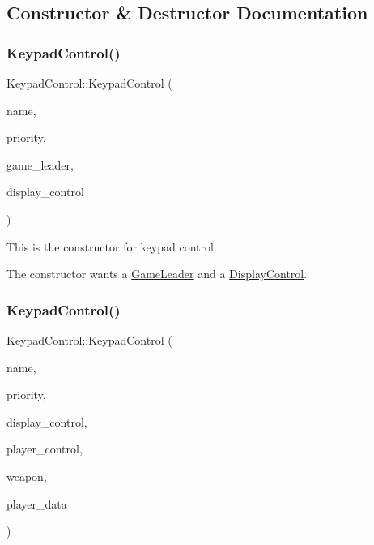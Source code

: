 \subsection{Constructor \& Destructor Documentation}
\mbox{\label{class_keypad_control_ade69a59ba2a34bde40809433952cb153}} 
\subsubsection{\texorpdfstring{Keypad\+Control()}{KeypadControl()}\hspace{0.1cm}{\footnotesize\ttfamily [1/2]}}
{\footnotesize\ttfamily Keypad\+Control\+::\+Keypad\+Control (\begin{DoxyParamCaption}\item[{const char $\ast$}]{name,  }\item[{int}]{priority,  }\item[{\mbox{\hyperlink{class_game_leader}{Game\+Leader}} \&}]{game\+\_\+leader,  }\item[{\mbox{\hyperlink{class_display_control}{Display\+Control}} \&}]{display\+\_\+control }\end{DoxyParamCaption})\hspace{0.3cm}{\ttfamily [inline]}}



This is the constructor for keypad control. 

The constructor wants a \mbox{\hyperlink{class_game_leader}{Game\+Leader}} and a \mbox{\hyperlink{class_display_control}{Display\+Control}}. \mbox{\label{class_keypad_control_a4de1bb3018f819011222461d64aa2d67}} 
\subsubsection{\texorpdfstring{Keypad\+Control()}{KeypadControl()}\hspace{0.1cm}{\footnotesize\ttfamily [2/2]}}
{\footnotesize\ttfamily Keypad\+Control\+::\+Keypad\+Control (\begin{DoxyParamCaption}\item[{const char $\ast$}]{name,  }\item[{int}]{priority,  }\item[{\mbox{\hyperlink{class_display_control}{Display\+Control}} \&}]{display\+\_\+control,  }\item[{\mbox{\hyperlink{class_player_control}{Player\+Control}} \&}]{player\+\_\+control,  }\item[{\mbox{\hyperlink{class_weapon}{Weapon}} \&}]{weapon,  }\item[{\mbox{\hyperlink{class_player_data}{Player\+Data}} \&}]{player\+\_\+data }\end{DoxyParamCaption})\hspace{0.3cm}{\ttfamily [inline]}}



